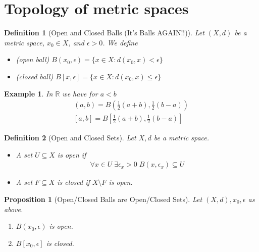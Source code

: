 \documentclass[11pt, oneside]{book}
\theoremstyle{break}
\newtheorem{propo}{Proposition}[section]
\newtheorem{defn}{Definition}[section]
\newtheorem{eg}{Example}[section]
\newcommand{\bb}[1]{\mathbb{#1}}			%
\begin{document}
\section{Topology of metric spaces}\label{sect:topology of metric spaces}

\begin{defn}[Open and Closed Balls (It's Balls AGAIN!!)]
	Let $(X, d)$ be a metric space, $x_0 \in X$, and $\epsilon > 0$. We define
	\begin{itemize}
		\item (open ball) $B(x_0, \epsilon) = \{ x \in X : d(x_0, x) < \epsilon \}$ \\
		\item (closed ball) $B[x, \epsilon] = \{ x \in X : d(x_0, x) \leq \epsilon \}$
	\end{itemize}
\end{defn}

\begin{eg}
	In $\bb{R}$ we have for $a < b$
	\begin{gather*}
		(a, b) = B \left( \frac{1}{2} (a + b), \frac{1}{2} (b - a) \right) \\
		[a, b] = B \left[ \frac{1}{2} (a + b), \frac{1}{2} (b - a) \right]
	\end{gather*}
\end{eg}

\begin{defn}[Open and Closed Sets]
	Let ${X, d}$ be a metric space.
	\begin{itemize}
		\item A set $U \subseteq X$ is open if
			\begin{gather}
				\forall x \in U \; \exists \epsilon_x > 0 \; B(x, \epsilon_x) \subseteq U
			\end{gather}

		\item A set $F \subseteq X$ is closed if $X \setminus F$ is open.
	\end{itemize}
\end{defn}

\begin{propo}[Open/Closed Balls are Open/Closed Sets]
	Let $(X, d), x_0, \epsilon$ as above.
	\begin{enumerate}
		\item $B(x_0, \epsilon)$ is open.
		\item $B[x_0, \epsilon]$ is closed.
	\end{enumerate}
\end{propo}
\end{document}
